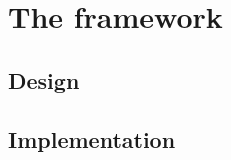 \chapter{The framework}
\label{chap:framework}
\section{Design}
\todo
\section{Implementation}
\todo